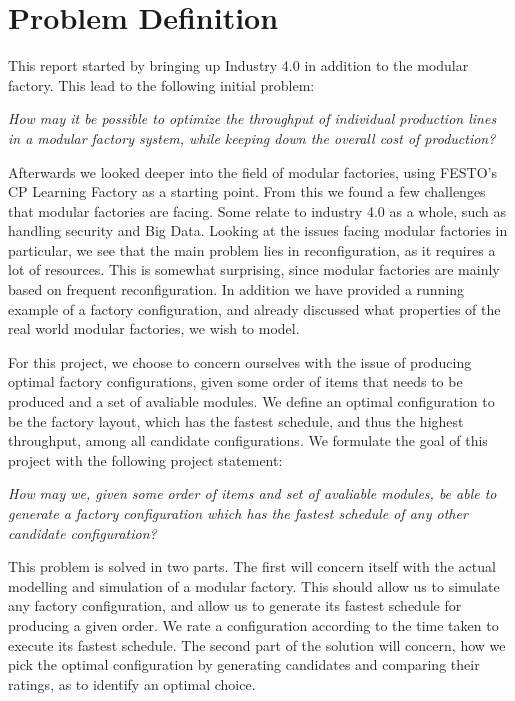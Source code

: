 \section{Problem Definition}\label{ch:problemdefinition}
This report started by bringing up Industry 4.0 in addition to the modular factory. This lead to the following initial problem:

\bigskip
\textit{How may it be possible to optimize the throughput of individual production lines in a modular factory system, while keeping down the overall cost of production?}
\bigskip

Afterwards we looked deeper into the field of modular factories, using FESTO's CP Learning Factory as a starting point. From this we found a few challenges that modular factories are facing. Some relate to industry 4.0 as a whole, such as handling security and Big Data. Looking at the issues facing modular factories in particular, we see that the main problem lies in reconfiguration, as it requires a lot of resources. This is somewhat surprising, since modular factories are mainly based on frequent reconfiguration. In addition we have provided a running example of a factory configuration, and already discussed what properties of the real world modular factories, we wish to model.

For this project, we choose to concern ourselves with the issue of producing optimal factory configurations, given some order of items that needs to be produced and a set of avaliable modules. We define an optimal configuration to be the factory layout, which has the fastest schedule, and thus the highest throughput, among all candidate configurations. We formulate the goal of this project with the following project statement:

\bigskip
\textit{How may we, given some order of items and set of avaliable modules, be able to generate a factory configuration which has the fastest schedule of any other candidate configuration?}
\bigskip

This problem is solved in two parts. The first will concern itself with the actual modelling and simulation of a modular factory. This should allow us to simulate any factory configuration, and allow us to generate its fastest schedule for producing a given order. We rate a configuration according to the time taken to execute its fastest schedule. The second part of the solution will concern, how we pick the optimal configuration by generating candidates and comparing their ratings, as to identify an optimal choice. 
